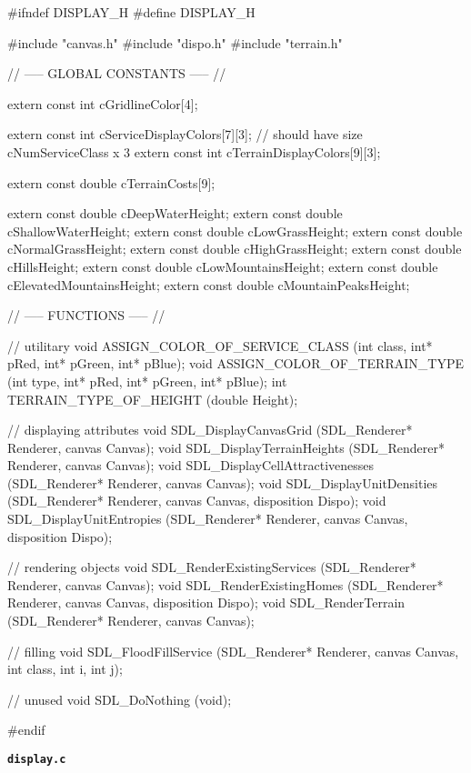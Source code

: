 \begin{C}
#ifndef DISPLAY_H
#define DISPLAY_H

#include "canvas.h"
#include "dispo.h"
#include "terrain.h"



// ----- GLOBAL CONSTANTS ----- //

extern const int cGridlineColor[4];

extern const int cServiceDisplayColors[7][3]; // should have size cNumServiceClass x 3
extern const int cTerrainDisplayColors[9][3];

extern const double cTerrainCosts[9];

extern const double cDeepWaterHeight;
extern const double cShallowWaterHeight;
extern const double cLowGrassHeight;
extern const double cNormalGrassHeight;
extern const double cHighGrassHeight;
extern const double cHillsHeight;
extern const double cLowMountainsHeight;
extern const double cElevatedMountainsHeight;
extern const double cMountainPeaksHeight;


// ----- FUNCTIONS ----- //

// utilitary
void ASSIGN_COLOR_OF_SERVICE_CLASS (int class, int* pRed, int* pGreen, int* pBlue);
void ASSIGN_COLOR_OF_TERRAIN_TYPE (int type, int* pRed, int* pGreen, int* pBlue);
int TERRAIN_TYPE_OF_HEIGHT (double Height);

// displaying attributes
void SDL_DisplayCanvasGrid (SDL_Renderer* Renderer, canvas Canvas);
void SDL_DisplayTerrainHeights (SDL_Renderer* Renderer, canvas Canvas);
void SDL_DisplayCellAttractivenesses (SDL_Renderer* Renderer, canvas Canvas);
void SDL_DisplayUnitDensities (SDL_Renderer* Renderer, canvas Canvas, disposition Dispo);
void SDL_DisplayUnitEntropies (SDL_Renderer* Renderer, canvas Canvas, disposition Dispo);

// rendering objects
void SDL_RenderExistingServices (SDL_Renderer* Renderer, canvas Canvas);
void SDL_RenderExistingHomes (SDL_Renderer* Renderer, canvas Canvas, disposition Dispo);
void SDL_RenderTerrain (SDL_Renderer* Renderer, canvas Canvas);

// filling
void SDL_FloodFillService (SDL_Renderer* Renderer, canvas Canvas, int class, int i, int j);



// unused
void SDL_DoNothing (void);


#endif	
\end{C}
\vspace*{5mm}
{\Large \texttt{\textbf{display.c}}}
\vspace*{1mm}
